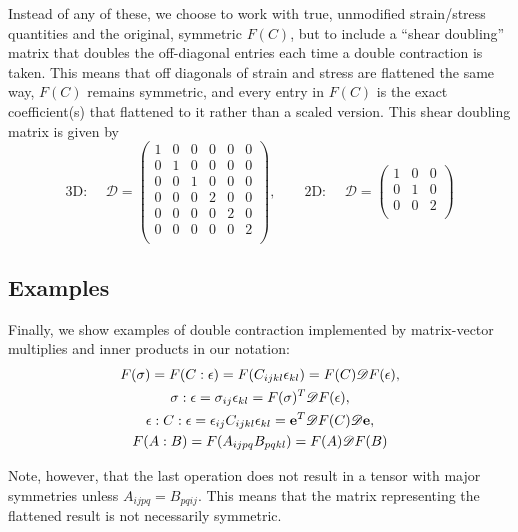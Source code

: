 \documentclass[10pt]{article}
\providecommand{\e}{\epsilon}
\begin{document}
Instead of any of these, we choose to work with true, unmodified strain/stress
quantities and the original, symmetric $F(C)$, but to include a ``shear
doubling'' matrix that doubles the off-diagonal entries each time a double
contraction is taken. This means that off diagonals of strain and stress are
flattened the same way, $F(C)$ remains symmetric, and every entry in $F(C)$ is
the exact coefficient(s) that flattened to it rather than a scaled version. This
shear doubling matrix is given by
$$
\text{3D: }\quad \mathscr{D} = \begin{pmatrix}
        1 & 0 & 0 & 0 & 0 & 0 \\
        0 & 1 & 0 & 0 & 0 & 0 \\
        0 & 0 & 1 & 0 & 0 & 0 \\
        0 & 0 & 0 & 2 & 0 & 0 \\
        0 & 0 & 0 & 0 & 2 & 0 \\
        0 & 0 & 0 & 0 & 0 & 2 \\
    \end{pmatrix}, \quad \quad
    \text{2D: }\quad \mathscr{D} = \begin{pmatrix}
        1 & 0 & 0 \\
        0 & 1 & 0 \\
        0 & 0 & 2 \\
    \end{pmatrix}
$$
\subsection{Examples}
Finally, we show examples of double contraction implemented by matrix-vector
multiplies and inner products in our notation:
\begin{gather*}
    F(\sigma) = F(C : \e) = F(C_{ijkl} \e_{kl}) = F(C) \mathscr{D} F(\e), \\
    \sigma : \e = \sigma_{ij} \e_{kl} = F(\sigma)^T \mathscr{D} F(\e), \\
    \e : C : \e = \e_{ij} C_{ijkl} \e_{kl} = {\bf e}^T \mathscr{D} F(C) \mathscr{D} {\bf e}, \\
    F(A : B) = F(A_{ijpq} B_{pqkl}) = F(A) \mathscr{D} F(B)
\end{gather*}

Note, however, that the last operation does not result in a tensor with major
symmetries unless $A_{ijpq} = B_{pqij}$. This means that the matrix representing
the flattened result is not necessarily symmetric.
\end{document}

